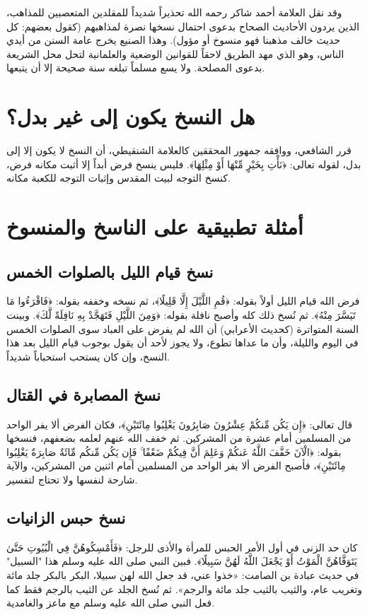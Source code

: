وقد نقل العلامة أحمد شاكر رحمه الله تحذيراً شديداً للمقلدين المتعصبين للمذاهب، الذين يردون الأحاديث الصحاح بدعوى احتمال نسخها نصرة لمذاهبهم (كقول بعضهم: كل حديث خالف مذهبنا فهو منسوخ أو مؤول). وهذا الصنيع يخرج عامة السنن من أيدي الناس، وهو الذي مهد الطريق لاحقاً للقوانين الوضعية والعلمانية لتحل محل الشريعة بدعوى المصلحة. ولا يسع مسلماً تبلغه سنة صحيحة إلا أن يتبعها.

\section{هل النسخ يكون إلى غير بدل؟}
قرر الشافعي، ووافقه جمهور المحققين كالعلامة الشنقيطي، أن النسخ لا يكون إلا إلى بدل، لقوله تعالى: ﴿نَأْتِ بِخَيْرٍ مِّنْهَا أَوْ مِثْلِهَا﴾. فليس ينسخ فرض أبداً إلا أثبت مكانه فرض، كنسخ التوجه لبيت المقدس وإثبات التوجه للكعبة مكانه. 

\section{أمثلة تطبيقية على الناسخ والمنسوخ}

\subsection{نسخ قيام الليل بالصلوات الخمس}
فرض الله قيام الليل أولاً بقوله: ﴿قُمِ اللَّيْلَ إِلَّا قَلِيلًا﴾، ثم نسخه وخففه بقوله: ﴿فَاقْرَءُوا مَا تَيَسَّرَ مِنْهُ﴾. ثم نُسخ ذلك كله وأصبح نافلة بقوله: ﴿وَمِنَ اللَّيْلِ فَتَهَجَّدْ بِهِ نَافِلَةً لَّكَ﴾. وبينت السنة المتواترة (كحديث الأعرابي) أن الله لم يفرض على العباد سوى الصلوات الخمس في اليوم والليلة، وأن ما عداها تطوع، ولا يجوز لأحد أن يقول بوجوب قيام الليل بعد هذا النسخ، وإن كان يستحب استحباباً شديداً.

\subsection{نسخ المصابرة في القتال}
قال تعالى: ﴿إِن يَكُن مِّنكُمْ عِشْرُونَ صَابِرُونَ يَغْلِبُوا مِائَتَيْنِ﴾، فكان الفرض ألا يفر الواحد من المسلمين أمام عشرة من المشركين. ثم خفف الله عنهم لعلمه بضعفهم، فنسخها بقوله: ﴿الْآنَ خَفَّفَ اللَّهُ عَنكُمْ وَعَلِمَ أَنَّ فِيكُمْ ضَعْفًا ۚ فَإِن يَكُن مِّنكُم مِّائَةٌ صَابِرَةٌ يَغْلِبُوا مِائَتَيْنِ﴾، فأصبح الفرض ألا يفر الواحد من المسلمين أمام اثنين من المشركين، والآية شارحة لنفسها ولا تحتاج لتفسير.

\subsection{نسخ حبس الزانيات}
كان حد الزنى في أول الأمر الحبس للمرأة والأذى للرجل: ﴿فَأَمْسِكُوهُنَّ فِي الْبُيُوتِ حَتَّىٰ يَتَوَفَّاهُنَّ الْمَوْتُ أَوْ يَجْعَلَ اللَّهُ لَهُنَّ سَبِيلًا﴾. فبين النبي صلى الله عليه وسلم هذا "السبيل" في حديث عبادة بن الصامت: «خذوا عني، قد جعل الله لهن سبيلا، البكر بالبكر جلد مائة وتغريب عام، والثيب بالثيب جلد مائة والرجم». ثم نُسخ الجلد عن الثيب بالرجم فقط كما فعل النبي صلى الله عليه وسلم مع ماعز والغامدية.

